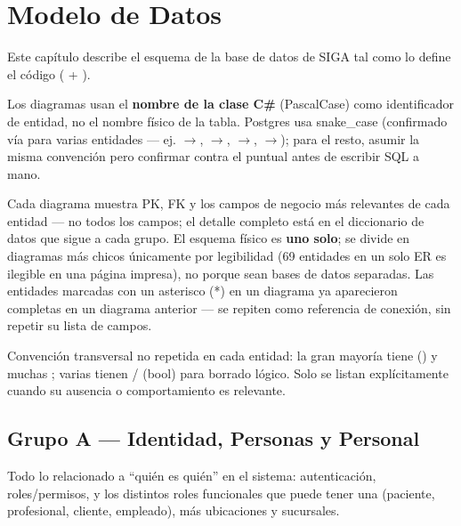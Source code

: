 \chapter{Modelo de Datos}
\label{sec:modelo-datos}

Este capítulo describe el esquema de la base de datos de SIGA tal como lo define el código (\allowbreak {}\allowbreak {} + \allowbreak {}\allowbreak {}\allowbreak {}).

Los diagramas usan el \textbf{nombre de la clase C\#} (PascalCase) como identificador de entidad, no el nombre físico de la tabla. Postgres usa snake\_case (confirmado vía \allowbreak {}\allowbreak {}\allowbreak {}\allowbreak {} para varias entidades --- ej. $\to$, $\to$, $\to$, $\to$); para el resto, asumir la misma convención pero confirmar contra el  puntual antes de escribir SQL a mano.

Cada diagrama muestra PK, FK y los campos de negocio más relevantes de cada entidad --- no todos los campos; el detalle completo está en el diccionario de datos que sigue a cada grupo. El esquema físico es \textbf{uno solo}; se divide en diagramas más chicos únicamente por legibilidad (69 entidades en un solo ER es ilegible en una página impresa), no porque sean bases de datos separadas. Las entidades marcadas con un asterisco (*) en un diagrama ya aparecieron completas en un diagrama anterior --- se repiten como referencia de conexión, sin repetir su lista de campos.

Convención transversal no repetida en cada entidad: la gran mayoría tiene  () y muchas ; varias tienen / (bool) para borrado lógico. Solo se listan explícitamente cuando su ausencia o comportamiento es relevante.

\section{Grupo A --- Identidad, Personas y Personal}
\label{sec:modelo-grupo-a}

Todo lo relacionado a ``quién es quién'' en el sistema: autenticación, roles/permisos, y los distintos roles funcionales que puede tener una  (paciente, profesional, cliente, empleado), más ubicaciones y sucursales.

